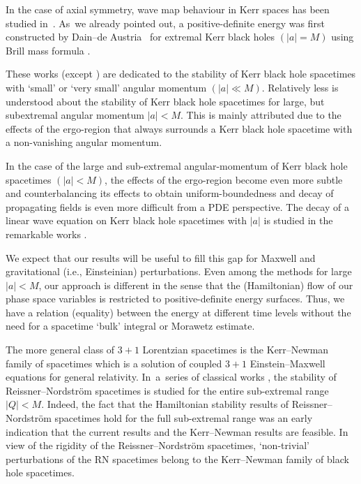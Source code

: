 \documentclass[pdftex]{sigma}
\numberwithin{equation}{section}
\begin{document}
In the case of axial symmetry, wave map behaviour in Kerr spaces has been studied in~\cite{IK_15}. As~we already pointed out, a positive-definite energy was first constructed by Dain--de Austria~\cite{DA_14} for extremal Kerr black holes $(\vert a \vert =M)$ using Brill mass formula \cite{B59, D09}.

 These works (except \cite{DA_14}) are dedicated to the stability of Kerr black hole spacetimes with `small' or `very small' angular momentum $(\vert a \vert \ll M)$. Relatively less is understood about the stability of Kerr black hole spacetimes for large, but subextremal angular momentum $ \vert a \vert<M$. This is mainly attributed due to the effects of the ergo-region that always surrounds a Kerr black hole spacetime with a non-vanishing angular momentum.

In the case of the large and sub-extremal angular-momentum of Kerr black hole spacetimes $ (\vert a \vert <M)$, the effects of the ergo-region become even more subtle and counterbalancing its effects to obtain uniform-boundedness and decay of propagating fields is even more difficult from a PDE perspective.
The decay of a linear wave equation on Kerr black hole spacetimes with $\vert a \vert$ is studied in the remarkable works \cite{DRS_16, FKSY_05,FKSY_06,FKSY_08}.

 We expect that our results will be useful to fill this gap for Maxwell and gravitational (i.e., Einsteinian) perturbations. Even among the methods for large $\vert a \vert<M$, our approach is different in the sense that the (Hamiltonian) flow of our phase space variables is restricted to positive-definite energy surfaces. Thus, we have a relation (equality) between the energy at different time levels without the need for a spacetime `bulk' integral or Morawetz estimate.

The more general class of $3+1$ Lorentzian spacetimes is the Kerr--Newman family of spacetimes which is a solution of coupled $3+1$ Einstein--Maxwell equations for general relativity. In~a~series of classical works \cite{Moncrief_74_1,Moncrief_74_2,Moncrief_74_3}, the stability of Reissner--Nordstr\"om spacetimes is studied for the entire sub-extremal range $\vert Q \vert <M$. Indeed, the fact that the Hamiltonian stability results of Reissner--Nordstr\"om spacetimes hold for the full sub-extremal range was an early indication that the current results and the Kerr--Newman results \cite{GM17_gentitle} are feasible. In view of the rigidity of the Reissner--Nordstr\"om spacetimes, `non-trivial' perturbations of the RN spacetimes belong to the Kerr--Newman family of black hole spacetimes.
\end{document}
